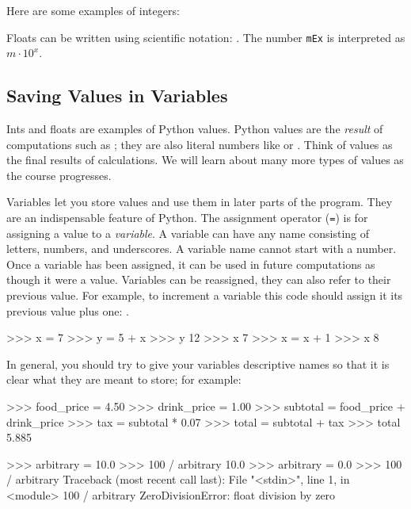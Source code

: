 \documentclass[11pt]{cselabheader}
\begin{document}
Here are some examples of integers:


Floats can be written using scientific notation: .
The number \texttt{mEx} is interpreted as $m \cdot 10^x$.


\subsection{Saving Values in Variables}
Ints and floats are examples of Python values.
Python values are the \textsl{result} of computations such as ;
they are also literal numbers like  or .
Think of values as the final results of calculations.
We will learn about many more types of values as the course progresses.

Variables let you store values and use them in later parts
of the program. They are an indispensable feature of Python.
The assignment operator (\texttt{=}) is for
assigning a value to a \textsl{variable}. A variable can have any name
consisting of letters, numbers, and underscores. A variable name cannot start
with a number. Once a variable has
been assigned, it can be used in future computations as though it were a
value. Variables can be reassigned, they can also refer to their previous
value. For example, to increment a variable  this code
should assign it its previous value plus one: .

\begin{pyconcode}
>>> x = 7
>>> y = 5 + x
>>> y
12
>>> x
7
>>> x = x + 1
>>> x
8

\end{pyconcode}

In general, you should try to give your variables descriptive names so that it is
clear what they are meant to store; for example:

\begin{pyconcode}
>>> food_price = 4.50
>>> drink_price = 1.00
>>> subtotal = food_price + drink_price
>>> tax = subtotal * 0.07
>>> total = subtotal + tax
>>> total
5.885

\end{pyconcode}

\begin{pyconcode}
>>> arbitrary = 10.0
>>> 100 / arbitrary
10.0
>>> arbitrary = 0.0
>>> 100 / arbitrary
Traceback (most recent call last):
  File "<stdin>", line 1, in <module>
    100 / arbitrary
ZeroDivisionError: float division by zero

\end{pyconcode}
\end{document}
